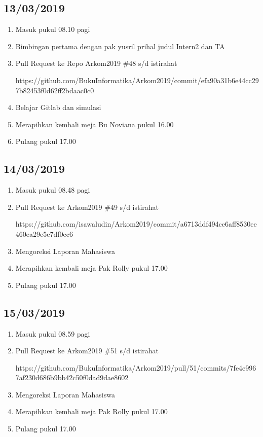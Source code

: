 \subsection{13/03/2019}
\begin{enumerate}
  \item Masuk pukul 08.10 pagi
  \item Bimbingan pertama dengan pak yusril prihal judul Intern2 dan TA
  \item Pull Request ke Repo Arkom2019 \#48 s/d istirahat
\par https://github.com/BukuInformatika/Arkom2019/commit/efa90a31b6e44cc297b82453f0d62ff2bdaac0c0
  \item Belajar Gitlab dan simulasi
  \item Merapihkan kembali meja Bu Noviana pukul 16.00
  \item Pulang pukul 17.00
\end{enumerate}

\subsection{14/03/2019}
\begin{enumerate}
  \item Masuk pukul 08.48 pagi
  \item Pull Request ke Arkom2019 \#49  s/d istirahat
\par https://github.com/isawaludin/Arkom2019/commit/a6713ddf494ce6aff8530ee460ea29e5e7df0ec6
  \item Mengoreksi Laporan Mahasiswa
  \item Merapihkan kembali meja Pak Rolly pukul 17.00
  \item Pulang pukul 17.00 
\end{enumerate}

\subsection{15/03/2019}
\begin{enumerate}
  \item Masuk pukul 08.59 pagi
  \item Pull Request ke Arkom2019 \#51  s/d istirahat
\par https://github.com/BukuInformatika/Arkom2019/pull/51/commits/7fe4e9967af230d686b9bb42c50f0dad9dae8602
  \item Mengoreksi Laporan Mahasiswa
  \item Merapihkan kembali meja Pak Rolly pukul 17.00
  \item Pulang pukul 17.00 
\end{enumerate}

